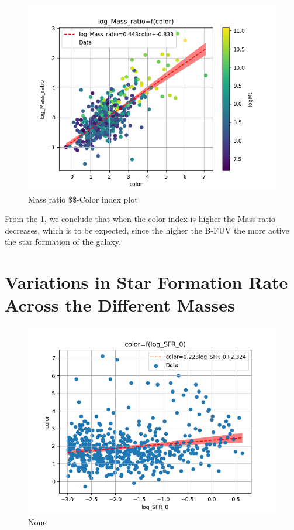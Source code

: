 \documentclass[a4paper,twocolumn]{article}
\begin{document}
\begin{figure}[!htpb]
\centering
\includegraphics[width=.9\linewidth]{./figs/color-log_Mass_ratio-color_logMt.png}
\caption{\label{fig:col_Mr}Mass ratio \$\$-Color index plot}
\end{figure}

From the \ref{fig:col_Mr}, we conclude that when the color index is higher the Mass ratio decreases, which is to be expected, since the higher the B-FUV the more active the star formation of the galaxy.



\section{Variations in Star Formation Rate Across the Different Masses}
\label{sec:orge561d63}


\begin{figure}[!htpb]
\centering
\includegraphics[width=.9\linewidth]{./figs/log_SFR_0-color.png}
\caption{\label{fig:None}None}
\end{figure}
\end{document}
